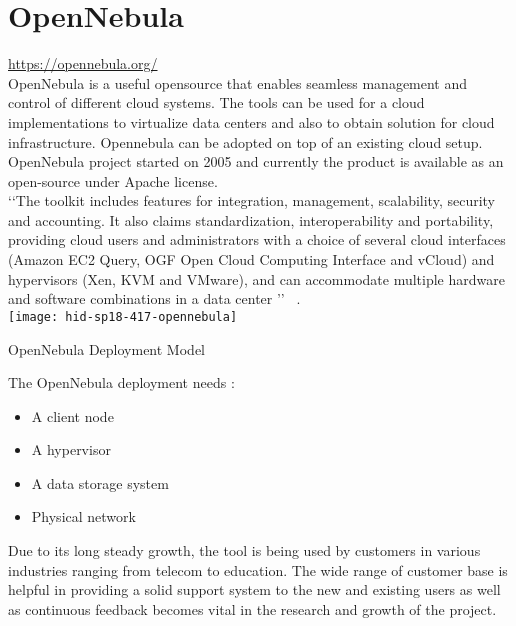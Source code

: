 
\graphicspath{ {images/} }
\section{OpenNebula}
\url{https://opennebula.org/} \\ 
   
OpenNebula is a useful opensource that enables seamless management and control of different cloud systems.
The tools can be used for a cloud implementations 
to virtualize data centers and also to obtain solution for cloud infrastructure.
Opennebula can be adopted on top of an existing cloud setup.
OpenNebula project started on 2005 and currently the product is available as an open-source under Apache license. \\
‘‘The toolkit includes features for integration, management, scalability, security and accounting.
It also claims standardization, interoperability and portability, providing cloud users and administrators with a choice of several
cloud interfaces (Amazon EC2 Query, OGF Open Cloud Computing Interface and vCloud) and hypervisors
(Xen, KVM and VMware), and can accommodate multiple hardware and software combinations in a data center ’’
~\cite{hid-sp18-417-opennebula-wiki}.\\

\texttt{[image: hid-sp18-417-opennebula]}
\begin{center}
OpenNebula Deployment Model ~\cite{hid-sp18-417-opennebula-deployment} 
\end{center}

The OpenNebula deployment needs :
\begin{itemize}
\item        A client node
\item        A hypervisor
\item        A data storage system
\item        Physical network
\end{itemize}

Due to its long steady growth, the tool is being used by customers in various industries ranging from telecom to education.
The wide range of customer base is helpful in providing a solid support system to the new and existing users as well as continuous
feedback becomes vital in the research and growth of the project. 

